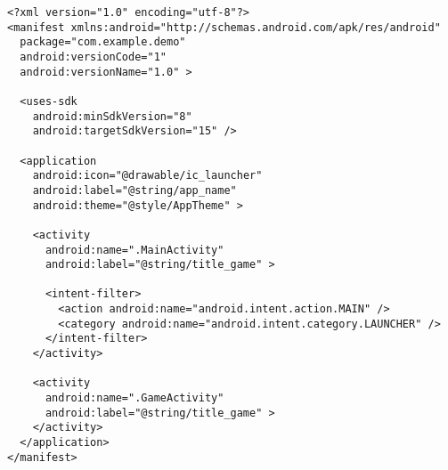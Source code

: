 \begin{lstlisting}[caption=AndroidManifext.xml]
<?xml version="1.0" encoding="utf-8"?>
<manifest xmlns:android="http://schemas.android.com/apk/res/android"
  package="com.example.demo"
  android:versionCode="1"
  android:versionName="1.0" >

  <uses-sdk
    android:minSdkVersion="8"
    android:targetSdkVersion="15" />

  <application
    android:icon="@drawable/ic_launcher"
    android:label="@string/app_name"
    android:theme="@style/AppTheme" >

    <activity
      android:name=".MainActivity"
      android:label="@string/title_game" >
            
      <intent-filter>
        <action android:name="android.intent.action.MAIN" />
        <category android:name="android.intent.category.LAUNCHER" />
      </intent-filter>
    </activity>
        
    <activity
      android:name=".GameActivity"
      android:label="@string/title_game" >
    </activity>
  </application>
</manifest>
\end{lstlisting}